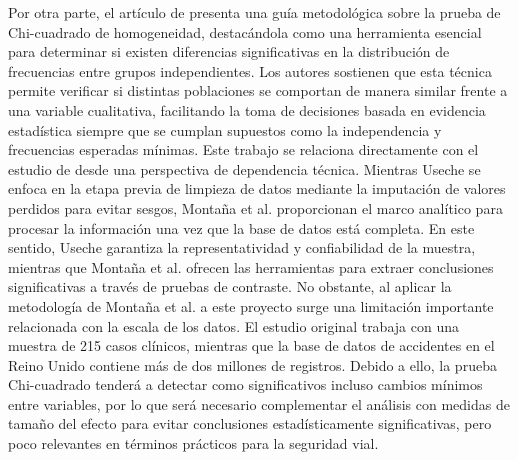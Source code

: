 \documentclass[12pt]{article}
\begin{document}
Por otra parte, el artículo de \textcite{MONTANA2025} presenta una guía metodológica sobre la prueba de Chi-cuadrado de homogeneidad, destacándola como una herramienta esencial para determinar si existen diferencias significativas en la distribución de frecuencias entre grupos independientes. Los autores sostienen que esta técnica permite verificar si distintas poblaciones se comportan de manera similar frente a una variable cualitativa, facilitando la toma de decisiones basada en evidencia estadística siempre que se cumplan supuestos como la independencia y frecuencias esperadas mínimas. Este trabajo se relaciona directamente con el estudio de \textcite{USECHE2006} desde una perspectiva de dependencia técnica. Mientras Useche se enfoca en la etapa previa de limpieza de datos mediante la imputación de valores perdidos para evitar sesgos, Montaña et al. proporcionan el marco analítico para procesar la información una vez que la base de datos está completa. En este sentido, Useche garantiza la representatividad y confiabilidad de la muestra, mientras que Montaña et al. ofrecen las herramientas para extraer conclusiones significativas a través de pruebas de contraste. No obstante, al aplicar la metodología de Montaña et al. a este proyecto surge una limitación importante relacionada con la escala de los datos. El estudio original trabaja con una muestra de 215 casos clínicos, mientras que la base de datos de accidentes en el Reino Unido contiene más de dos millones de registros. Debido a ello, la prueba Chi-cuadrado tenderá a detectar como significativos incluso cambios mínimos entre variables, por lo que será necesario complementar el análisis con medidas de tamaño del efecto para evitar conclusiones estadísticamente significativas, pero poco relevantes en términos prácticos para la seguridad vial.
\end{document}
